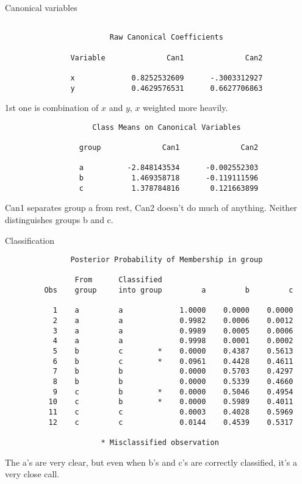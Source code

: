\documentclass[pdf]{prosper}
\begin{document}
\begin{slide}{Canonical variables}
  {\scriptsize
\begin{verbatim}
 
                        Raw Canonical Coefficients
 
               Variable              Can1              Can2

               x             0.8252532609      -.3003312927
               y             0.4629576531      0.6627706863

\end{verbatim}
}

1st one is combination of $x$ and $y$, $x$ weighted more heavily.

{\scriptsize
\begin{verbatim}
                    Class Means on Canonical Variables
 
                 group              Can1              Can2

                 a          -2.848143534      -0.002552303
                 b           1.469358718      -0.119111596
                 c           1.378784816       0.121663899

\end{verbatim}
}
Can1 separates group a from rest, Can2 doesn't do much of anything. Neither distinguishes groups b and c.

\end{slide}

\begin{slide}{Classification}

{\scriptsize
\begin{verbatim}
               Posterior Probability of Membership in group
 
                From      Classified
         Obs    group     into group         a         b         c

           1    a         a             1.0000    0.0000    0.0000
           2    a         a             0.9982    0.0006    0.0012
           3    a         a             0.9989    0.0005    0.0006
           4    a         a             0.9998    0.0001    0.0002
           5    b         c        *    0.0000    0.4387    0.5613
           6    b         c        *    0.0961    0.4428    0.4611
           7    b         b             0.0000    0.5703    0.4297
           8    b         b             0.0000    0.5339    0.4660
           9    c         b        *    0.0000    0.5046    0.4954
          10    c         b        *    0.0000    0.5989    0.4011
          11    c         c             0.0003    0.4028    0.5969
          12    c         c             0.0144    0.4539    0.5317

                      * Misclassified observation    

\end{verbatim}
}

The a's are very clear, but even when b's and c's are correctly classified, it's a very close call.
  
\end{slide}
\end{document}
